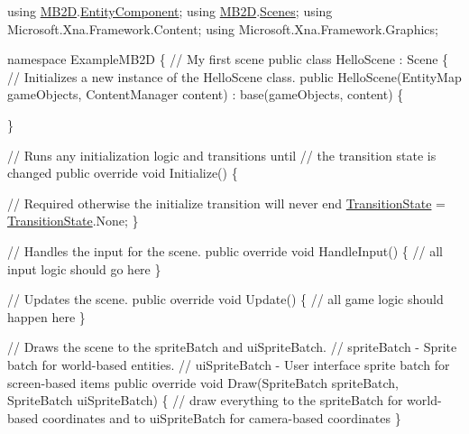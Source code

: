\begin{DoxyCode}
\textcolor{keyword}{using} \hyperlink{namespace_m_b2_d}{MB2D}.\hyperlink{namespace_m_b2_d_1_1_entity_component}{EntityComponent};
\textcolor{keyword}{using} \hyperlink{namespace_m_b2_d}{MB2D}.\hyperlink{namespace_m_b2_d_1_1_scenes}{Scenes};
\textcolor{keyword}{using} Microsoft.Xna.Framework.Content;
\textcolor{keyword}{using} Microsoft.Xna.Framework.Graphics;

\textcolor{keyword}{namespace }ExampleMB2D
\{
  \textcolor{comment}{// My first scene}
  \textcolor{keyword}{public} \textcolor{keyword}{class }HelloScene : Scene
  \{
    \textcolor{comment}{// Initializes a new instance of the HelloScene class.}
    \textcolor{keyword}{public} HelloScene(EntityMap gameObjects, ContentManager content) : base(gameObjects, content)
    \{

    \}

    \textcolor{comment}{// Runs any initialization logic and transitions until}
    \textcolor{comment}{// the transition state is changed}
    \textcolor{keyword}{public} \textcolor{keyword}{override} \textcolor{keywordtype}{void} Initialize()
    \{

      \textcolor{comment}{// Required otherwise the initialize transition will never end}
      \hyperlink{namespace_m_b2_d_1_1_scenes_a0e0db3f97bbaa272f70534c5954c4acc}{TransitionState} = \hyperlink{namespace_m_b2_d_1_1_scenes_a0e0db3f97bbaa272f70534c5954c4acc}{TransitionState}.None;
    \}

    \textcolor{comment}{// Handles the input for the scene.}
    \textcolor{keyword}{public} \textcolor{keyword}{override} \textcolor{keywordtype}{void} HandleInput() 
    \{
        \textcolor{comment}{// all input logic should go here}
    \}

    \textcolor{comment}{// Updates the scene.}
    \textcolor{keyword}{public} \textcolor{keyword}{override} \textcolor{keywordtype}{void} Update() 
    \{
        \textcolor{comment}{// all game logic should happen here}
    \}

    \textcolor{comment}{// Draws the scene to the spriteBatch and uiSpriteBatch.}
    \textcolor{comment}{// spriteBatch - Sprite batch for world-based entities.}
    \textcolor{comment}{// uiSpriteBatch - User interface sprite batch for screen-based items}
    \textcolor{keyword}{public} \textcolor{keyword}{override} \textcolor{keywordtype}{void} Draw(SpriteBatch spriteBatch, SpriteBatch uiSpriteBatch)
    \{
        \textcolor{comment}{// draw everything to the spriteBatch for world-based coordinates and to uiSpriteBatch for
       camera-based coordinates}
    \}


\end{DoxyCode}
